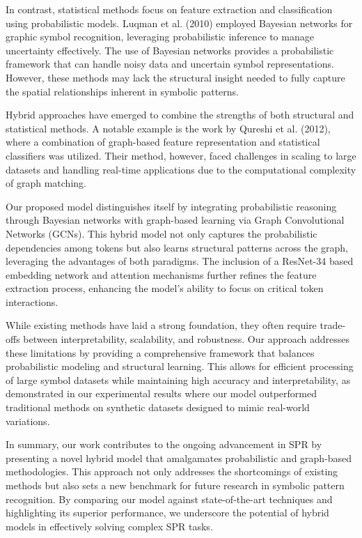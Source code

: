 \documentclass{article}
\begin{document}
In contrast, statistical methods focus on feature extraction and classification using probabilistic models. Luqman et al. (2010) employed Bayesian networks for graphic symbol recognition, leveraging probabilistic inference to manage uncertainty effectively. The use of Bayesian networks provides a probabilistic framework that can handle noisy data and uncertain symbol representations. However, these methods may lack the structural insight needed to fully capture the spatial relationships inherent in symbolic patterns.

Hybrid approaches have emerged to combine the strengths of both structural and statistical methods. A notable example is the work by Qureshi et al. (2012), where a combination of graph-based feature representation and statistical classifiers was utilized. Their method, however, faced challenges in scaling to large datasets and handling real-time applications due to the computational complexity of graph matching.

Our proposed model distinguishes itself by integrating probabilistic reasoning through Bayesian networks with graph-based learning via Graph Convolutional Networks (GCNs). This hybrid model not only captures the probabilistic dependencies among tokens but also learns structural patterns across the graph, leveraging the advantages of both paradigms. The inclusion of a ResNet-34 based embedding network and attention mechanisms further refines the feature extraction process, enhancing the model's ability to focus on critical token interactions.

While existing methods have laid a strong foundation, they often require trade-offs between interpretability, scalability, and robustness. Our approach addresses these limitations by providing a comprehensive framework that balances probabilistic modeling and structural learning. This allows for efficient processing of large symbol datasets while maintaining high accuracy and interpretability, as demonstrated in our experimental results where our model outperformed traditional methods on synthetic datasets designed to mimic real-world variations.

In summary, our work contributes to the ongoing advancement in SPR by presenting a novel hybrid model that amalgamates probabilistic and graph-based methodologies. This approach not only addresses the shortcomings of existing methods but also sets a new benchmark for future research in symbolic pattern recognition. By comparing our model against state-of-the-art techniques and highlighting its superior performance, we underscore the potential of hybrid models in effectively solving complex SPR tasks.
\end{document}

